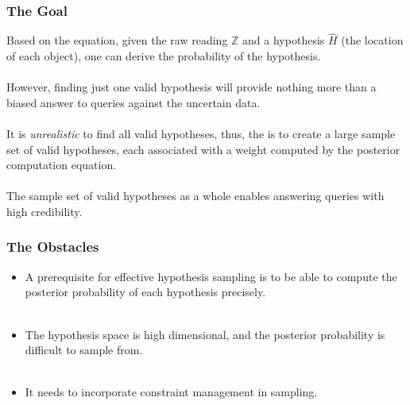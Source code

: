 
\begin{frame}
\frametitle{The Goal}

Based on the equation, given the raw reading $\mathbb{Z}$ and a hypothesis $\hat{H}$ (the location of each object), one can derive the probability of the hypothesis.\\~\\

However, finding just one valid hypothesis will provide nothing more than a biased answer to queries against the uncertain data.\\~\\

It is \emph{unrealistic} to find all valid hypotheses, thus, the  is to create a large sample set of valid hypotheses, each associated with a weight computed by the posterior computation equation.\\~\\

The sample set of valid hypotheses as a whole enables answering queries with high credibility.

\end{frame}


\begin{frame}
\frametitle{The Obstacles}

\begin{itemize}
  \item A prerequisite for effective hypothesis sampling is to be able to compute the posterior probability of each hypothesis precisely.\\~\\
  \item The hypothesis space is high dimensional, and the posterior probability is difficult to sample from.\\~\\
  \item It needs to incorporate constraint management in sampling.
\end{itemize}

\end{frame}


